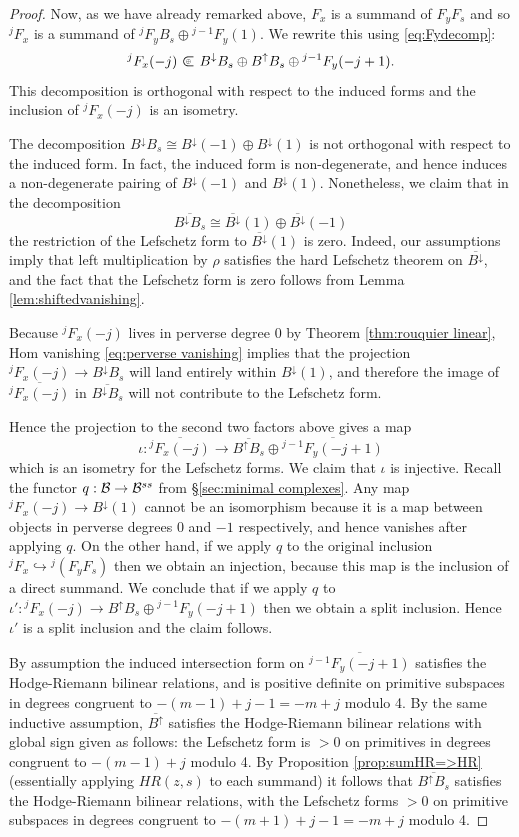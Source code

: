 \documentclass[11pt]{amsart}
\numberwithin{equation}{section}
\def\ov{\overline}
\def\to{\rightarrow}
\def\summand{
\mathbin{\tikz [baseline=-3pt]
{
\clip (-0.2,-0.15) rectangle (0.2,0.15);
\node[scale=1.2] at (0,0) {$\subset$}; \node[scale=0.5] at
  (0,0) {$\oplus$}; }}
}
\theoremstyle{definition}
\theoremstyle{remark}
\begin{document}
{\begin{proof}
Now, as we have already remarked above, $F_x$ is a summand of
$F_{y}F_s$ and so ${}^jF_x$ 
is a summand of $^jF_{y}B_s \oplus {}^{j-1} F_{y}(1)$. We
rewrite this using \eqref{eq:Fydecomp}:
\[
^jF_x(-j) \summand B^{\downarrow}B_s \oplus B^{\uparrow}B_s \oplus {}^{j-1}F_{y}(-j+1).
\]
This decomposition is orthogonal with respect to the induced forms 
and the inclusion of ${}^jF_x(-j)$  is an isometry.

The decomposition $B^{\downarrow}B_s \cong B^{\downarrow}(-1) \oplus B^{\downarrow}(1)$ is not orthogonal with respect to the induced form. In fact,
the induced form is non-degenerate, and hence induces a non-degenerate
pairing of $B^{\downarrow}(-1)$ and $B^{\downarrow}(1)$. Nonetheless,
we claim that in the decomposition
\[
\overline{B^{\downarrow}B_s} \cong  \overline{B^{\downarrow}}(1)
\oplus \overline{B^{\downarrow}}(-1)
\]
the restriction of the Lefschetz form to $\overline{B^{\downarrow}}(1)$
is zero.  Indeed, our assumptions imply that left multiplication by
$\rho$ satisfies the hard Lefschetz theorem on
$\overline{B^{\downarrow}}$, and the fact that the Lefschetz form
is zero follows from Lemma \ref{lem:shiftedvanishing}.

Because ${}^j F_x(-j)$ lives in perverse degree $0$ by Theorem \ref{thm:rouquier
linear}, Hom vanishing \eqref{eq:perverse vanishing} implies that the projection ${}^j F_x(-j) \to B^{\downarrow}B_s$ will land entirely within
$B^{\downarrow}(1)$, and therefore the image of $\overline{{}^j F_x(-j)}$
in $\overline{B^{\downarrow}B_s}$ will not contribute to the Lefschetz form.

Hence the projection to the second two factors above gives a map \[ \iota : \overline{{}^jF_x(-j)} \to\overline{B^{\uparrow}B_s} \oplus
\overline{{}^{j-1}F_{y}(-j+1)} \] which is an isometry for the
Lefschetz forms. We claim that $\iota$ is injective. Recall the functor
$q : \BC \to \BC^{ss}$ from \S\ref{sec:minimal complexes}. Any map ${}^j F_x(-j) \to
B^{\downarrow}(1)$ cannot be an isomorphism because it is a map
between objects in perverse degrees $0$ and $-1$ respectively, and
hence vanishes after applying $q$. On the other hand, if we apply $q$
to the original inclusion ${}^jF_x \hookrightarrow {}^j(F_yF_s)$ then
we obtain an injection, because this map is the inclusion of a direct
summand. We conclude that if we apply $q$ to $\iota' : {}^jF_x(-j)  \to
B^{\uparrow}B_s \oplus {}^{j-1}F_{y}(-j+1)$ then we obtain a split
inclusion. Hence $\iota'$ is a split inclusion and the claim follows.

By assumption the induced intersection form on $\overline{^{j-1}F_{y}(-j+1)}$ satisfies the Hodge-Riemann bilinear relations, and is positive
definite on primitive subspaces in degrees congruent to $-(m-1)+j-1= -m+j$ modulo 4. By the same inductive assumption, $\overline{B^\uparrow}$
satisfies the Hodge-Riemann bilinear relations with global sign given as follows: the Lefschetz form is $>0$ on primitives in degrees congruent to
$-(m-1)+j$ modulo 4. By Proposition \ref{prop:sumHR=>HR} (essentially applying $HR(z,s)$ to each summand) it follows that $\ov{B^\uparrow B_s}$
satisfies the Hodge-Riemann bilinear relations, with the Lefschetz forms $>0$ on primitive subspaces in degrees congruent to $-(m+1)+j-1 = -m+j$
modulo 4.


\end{proof}}
\end{document}
